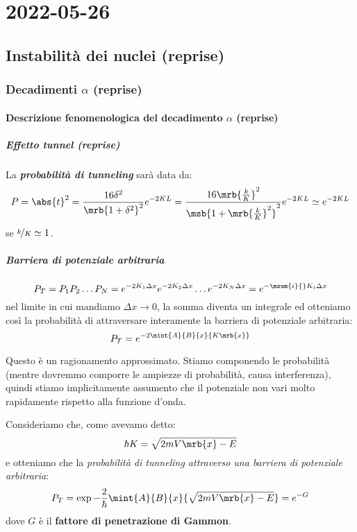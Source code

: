 \chapter{2022-05-26}
\section{Instabilità dei nuclei (reprise)}
\subsection{Decadimenti $\alpha$ (reprise)}
\subsubsection{Descrizione fenomenologica del decadimento $\alpha$ (reprise)}
\paragraph{Effetto tunnel (reprise)}
La \textit{\textbf{probabilità di tunneling}} sarà data da:
\[
  P = \abs{t}^{2} = \frac{16 \delta^2}{\mrb{1 + \delta^2}^{2}} e^{-2 K L}
  = \frac{16 \mrb{\frac{k}{K}}^{2}}{\msb{1 + \mrb{\frac{k}{K}}^{2}}^{2}} e^{-2
  K L} \simeq e^{-2 K L}
\]
se $\nicefrac{k}{K} \simeq 1$.

\paragraph{Barriera di potenziale arbitraria}
\[
  P_{T} = P_1 P_2 \dots P_N = e^{-2 K_1 \Delta x} e^{-2 K_2 \Delta x} \dots
  e^{-2 K_N \Delta x} = e^{-\msum{i}{} K_i \Delta x}
\]
nel limite in cui mandiamo $\Delta x \to 0$, la somma diventa un integrale ed
otteniamo così la probabilità di attraversare interamente la barriera di
potenziale arbitraria:
\[
  P_T = e^{- 2 \mint{A}{B}{x}{K \mrb{x}}}
\]
\begin{note}[]
  Questo è un ragionamento approssimato. Stiamo componendo le probabilità
  (mentre dovremmo comporre le ampiezze di probabilità, causa interferenza),
  quindi stiamo implicitamente assumento che il potenziale non vari molto
  rapidamente rispetto alla funzione d'onda.
\end{note}
Consideriamo che, come avevamo detto:
\[
  \hbar K = \sqrt{2m V \mrb{x} - E}
\]
e otteniamo che la \textit{probabilità di tunneling attraverso una barriera di
potenziale arbitraria}:
\[
  P_T = \exp{-\frac{2}{\hbar} \mint{A}{B}{x}{\sqrt{2m V \mrb{x} - E}}} = e^{-G}
\]
dove $G$ è il \textbf{fattore di penetrazione di Gammon}.

